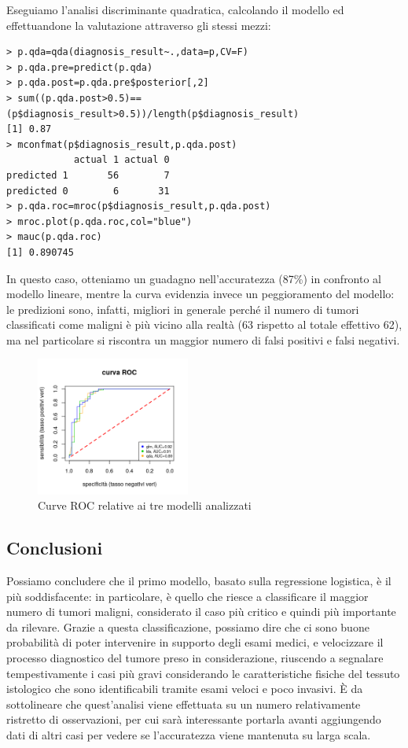 \documentclass[11pt,a4paper,oneside]{article}
\begin{document}
Eseguiamo l'analisi discriminante quadratica, calcolando il modello ed effettuandone la valutazione attraverso gli stessi mezzi:
\begin{verbatim}
> p.qda=qda(diagnosis_result~.,data=p,CV=F)
> p.qda.pre=predict(p.qda)
> p.qda.post=p.qda.pre$posterior[,2]
> sum((p.qda.post>0.5)==(p$diagnosis_result>0.5))/length(p$diagnosis_result)
[1] 0.87
> mconfmat(p$diagnosis_result,p.qda.post)
            actual 1 actual 0
predicted 1       56        7
predicted 0        6       31
> p.qda.roc=mroc(p$diagnosis_result,p.qda.post)
> mroc.plot(p.qda.roc,col="blue")
> mauc(p.qda.roc)
[1] 0.890745
\end{verbatim}
In questo caso, otteniamo un guadagno nell'accuratezza (87\%) in confronto al modello lineare, mentre la curva evidenzia invece un peggioramento del modello: le predizioni sono, infatti, migliori in generale perché il numero di tumori classificati come maligni è più vicino alla realtà (63 rispetto al totale effettivo 62), ma nel particolare si riscontra un maggior numero di falsi positivi e falsi negativi.
\begin{figure}[h]
\centering
\includegraphics[width=0.45\textwidth]{images/curveROC}
\caption{Curve ROC relative ai tre modelli analizzati}
\label{fig:curveROC}
\end{figure}

\subsection{Conclusioni}
Possiamo concludere che il primo modello, basato sulla regressione logistica, è il più soddisfacente: in particolare, è quello che riesce a classificare il maggior numero di tumori maligni, considerato il caso più critico e quindi più importante da rilevare. Grazie a questa classificazione, possiamo dire che ci sono buone probabilità di poter intervenire in supporto degli esami medici, e velocizzare il processo diagnostico del tumore preso in considerazione, riuscendo a segnalare tempestivamente i casi più gravi considerando le caratteristiche fisiche del tessuto istologico che sono identificabili tramite esami veloci e poco invasivi. È da sottolineare che quest'analisi viene effettuata su un numero relativamente ristretto di osservazioni, per cui sarà interessante portarla avanti aggiungendo dati di altri casi per vedere se l'accuratezza viene mantenuta su larga scala.
\end{document}
